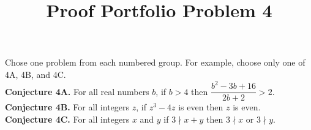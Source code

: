 \documentclass{article}  %
\title{Proof Portfolio Problem 4}
\author{}
\date{}
\begin{document}
\maketitle

Chose one problem from each numbered group.  For example, choose only one of 4A, 4B, and 4C.\\







\noindent\textbf{Conjecture 4A.}  For all real numbers $b$, if $b>4$ then $\dfrac{b^2-3b+16}{2b+2}>2$.\\

\noindent\textbf{Conjecture 4B.}  For all integers $z$, if $z^3-4z$ is even then $z$ is even.\\

\noindent\textbf{Conjecture 4C.} For all integers $x$ and $y$ if $3\nmid x+y$ then $3\nmid x$ or $3\nmid y$.
\end{document}
